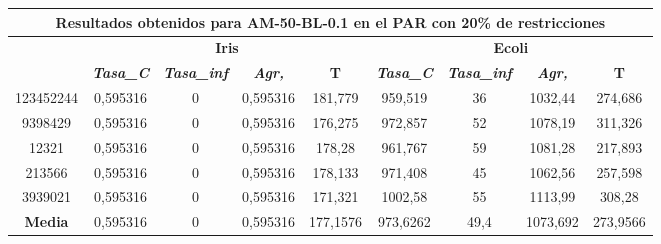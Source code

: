 \documentclass[12pt, spanish]{article}
\begin{document}
\begin{table}[H]
\footnotesize
\begin{tabular}{|c|c|c|c|c|c|c|c|c|}
\hline
\multicolumn{9}{|c|}{\textbf{Resultados obtenidos para AM-50-BL-0.1 en el PAR con 20\% de restricciones}}                                                                                                         \\ \hline
\multirow{2}{*}{} & \multicolumn{4}{c|}{\textbf{Iris}}                                                            & \multicolumn{4}{c|}{\textbf{Ecoli}}                                                           \\ \cline{2-9} 
                  & \textit{\textbf{Tasa\_C}} & \textit{\textbf{Tasa\_inf}} & \textit{\textbf{Agr,}} & \textbf{T} & \textit{\textbf{Tasa\_C}} & \textit{\textbf{Tasa\_inf}} & \textit{\textbf{Agr,}} & \textbf{T} \\ \hline
123452244         & 0,595316                  & 0                           & 0,595316               & 181,779    & 959,519                   & 36                          & 1032,44                & 274,686    \\ \hline
9398429           & 0,595316                  & 0                           & 0,595316               & 176,275    & 972,857                   & 52                          & 1078,19                & 311,326    \\ \hline
12321             & 0,595316                  & 0                           & 0,595316               & 178,28     & 961,767                   & 59                          & 1081,28                & 217,893    \\ \hline
213566            & 0,595316                  & 0                           & 0,595316               & 178,133    & 971,408                   & 45                          & 1062,56                & 257,598    \\ \hline
3939021           & 0,595316                  & 0                           & 0,595316               & 171,321    & 1002,58                   & 55                          & 1113,99                & 308,28     \\ \hline
\textbf{Media}    & 0,595316                  & 0                           & 0,595316               & 177,1576   & 973,6262                  & 49,4                        & 1073,692               & 273,9566   \\ \hline
\end{tabular}
\end{table}
\end{document}
